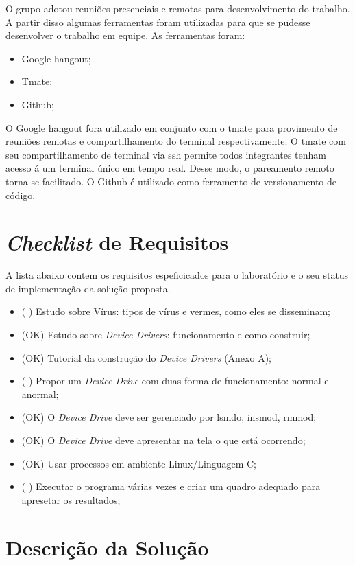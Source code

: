 O grupo adotou reuniões presenciais e remotas para desenvolvimento do trabalho. A partir
disso algumas ferramentas foram utilizadas para que se pudesse desenvolver o trabalho em
equipe. As ferramentas foram:

\begin{itemize}
  \item Google hangout;
  \item Tmate;
  \item Github;
\end{itemize}

O Google hangout fora utilizado em conjunto com o tmate para provimento de reuniões remotas
e compartilhamento do terminal respectivamente. O tmate com seu compartilhamento de terminal
via ssh permite todos integrantes tenham acesso á um terminal único em tempo real. Desse modo,
o pareamento remoto torna-se facilitado. O Github é utilizado como ferramento de versionamento
de código. 

\section{\textit{Checklist} de Requisitos}

A lista abaixo contem os requisitos espeficicados para o laboratório e o
seu status de implementação da solução proposta.

\begin{itemize}
  \item (  ) Estudo sobre Vírus: tipos de vírus e vermes, como eles se disseminam;
  \item (OK) Estudo sobre \textit{Device Drivers}: funcionamento e como construir;
  \item (OK) Tutorial da construção do \textit{Device Drivers} (Anexo A);
  \item (  ) Propor um \textit{Device Drive} com duas forma de funcionamento: normal e anormal;
  \item (OK) O \textit{Device Drive} deve ser gerenciado por lsmdo, insmod, rmmod;
  \item (OK) O \textit{Device Drive} deve apresentar na tela o que está ocorrendo;
  \item (OK) Usar processos em ambiente Linux/Linguagem C;
  \item (  ) Executar o programa várias vezes e criar um quadro adequado para apresetar os resultados;
\end{itemize}

\section{Descrição da Solução}

